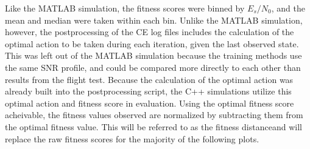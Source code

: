 \par Like the MATLAB simulation, the fitness scores were binned by $E_s/N_0$, and the mean and median were taken within each bin. Unlike the MATLAB simulation, however, the postprocessing of the CE log files includes the calculation of the optimal action to be taken during each iteration, given the last observed state. This was left out of the MATLAB simulation because the training methods use the same SNR profile, and could be compared more directly to each other than results from the flight test. Because the calculation of the optimal action was already built into the postprocessing script, the C++ simulations utilize this optimal action and fitness score in evaluation. Using the optimal fitness score acheivable, the fitness values observed are normalized by subtracting them from the optimal fitness value. This will be referred to as the fitness distanceand will replace the raw fitness scores for the majority of the following plots.
